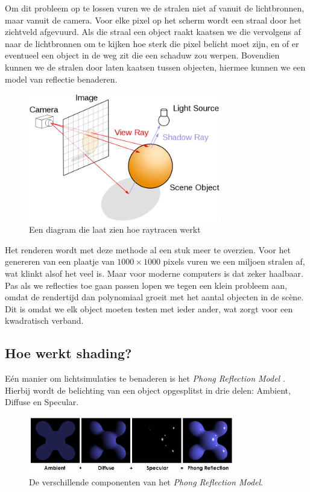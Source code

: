 \documentclass[12pt, a4paper]{article}
\begin{document}
Om dit probleem op te lossen vuren we de stralen niet af vanuit de lichtbronnen, maar vanuit de camera. Voor elke pixel op het scherm wordt een straal door het zichtveld afgevuurd. Als die straal een object raakt kaatsen we die vervolgens af naar de lichtbronnen om te kijken hoe sterk die pixel belicht moet zijn, en of er eventueel een object in de weg zit die een schaduw zou werpen. Bovendien kunnen we de stralen door laten kaatsen tussen objecten, hiermee kunnen we een model van reflectie benaderen. 

\begin{figure}[h]
    \centering
    \includegraphics[width=0.75\textwidth]{raytracing_diagram.png}
    \caption{Een diagram die laat zien hoe raytracen werkt}
    \label{fig:raytracing_diagram}
\end{figure}

Het renderen wordt met deze methode al een stuk meer te overzien. Voor het genereren van een plaatje van \(1000\times 1000\) pixels vuren we een miljoen stralen af, wat klinkt alsof het veel is. Maar voor moderne computers is dat zeker haalbaar. Pas als we reflecties toe gaan passen lopen we tegen een klein probleem aan, omdat de rendertijd dan polynomiaal groeit met het aantal objecten in de scène. Dit is omdat we elk object moeten testen met ieder ander, wat zorgt voor een kwadratisch verband.

\subsection{Hoe werkt shading?}
Eén manier om lichtsimulaties te benaderen is het \emph{Phong Reflection Model} \cite{PhongReflectionModel}. Hierbij wordt de belichting van een object opgesplitst in drie delen: Ambient, Diffuse en Specular.
\begin{figure}[h]
\centering
\includegraphics[width=0.8\textwidth]{Phong_components.png}
\caption{De verschillende componenten van het \emph{Phong Reflection Model}.}
\label{fig:phong_components}
\end{figure}
\end{document}
